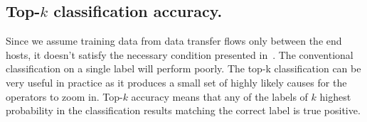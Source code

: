 \subsection{Top-$k$ classification accuracy.} 
Since we assume training data from data transfer flows only between the end hosts, it doesn't satisfy the necessary condition presented in~\cite{netbouncer:nsdi18}. The conventional classification on a single label will perform poorly. The top-k classification can be very useful in practice as it produces a small set of highly likely causes for the operators to zoom in. Top-$k$ accuracy means that any of the labels of $k$ highest probability in the classification results matching the correct label is true positive.